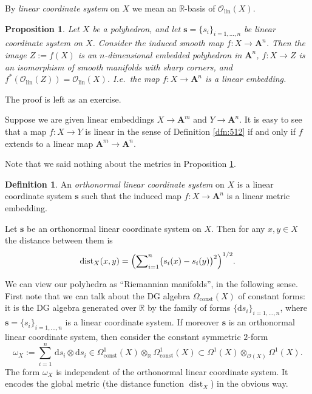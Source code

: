 \documentclass[10pt, a4paper]{amsart}
\newtheorem{prop}[equation]{Proposition}
\theoremstyle{definition}
\newtheorem{dfn}[equation]{Definition}
\numberwithin{equation}{section}
\newcommand{\opn}{\operatorname}
\newcommand{\mcal}[1]{\mathcal{#1}}
\newcommand{\mbf}[1]{\mathbf{#1}}
\newcommand{\mrm}[1]{\mathrm{#1}}
\newcommand{\mbb}[1]{\mathbb{#1}}
\newcommand{\bsym}[1]{\boldsymbol{#1}}
\newcommand{\bosum}{\sum\nolimits}
\newcommand{\R}{\mbb{R}}
\renewcommand{\d}{\mrm{d}}
\begin{document}
By {\em linear coordinate system} on $X$ we mean an $\R$-basis of
$\mcal{O}_{\mrm{lin}}(X)$.

\begin{prop} \label{prop:511}
Let $X$ be a polyhedron, and let $\bsym{s} = \{ s_i \}_{i = 1, \ldots, n}$
be linear coordinate system on $X$. Consider
the induced smooth map  $f : X \to \mbf{A}^{n}$.
Then the image $Z := f(X)$ is an $n$-dimensional embedded polyhedron in
$\mbf{A}^{n}$, $f : X \to Z$ is an isomorphism of 
smooth manifolds with sharp corners, and 
$f^*(\mcal{O}_{\mrm{lin}}(Z)) = \mcal{O}_{\mrm{lin}}(X)$.
I.e.\ the map $f : X \to \mbf{A}^{n}$ is a linear embedding. 
\end{prop}

The proof is left as an exercise. 

Suppose we are given linear embeddings $X \to \mbf{A}^{m}$ and 
$Y \to \mbf{A}^{n}$. It is easy to see that a map $f : X \to Y$ is linear in
the sense of Definition \ref{dfn:512} if and only if $f$ extends to a linear
map $\mbf{A}^{m} \to \mbf{A}^{n}$. 

Note that we said nothing about the metrics in Proposition \ref{prop:511}.

\begin{dfn}
An {\em orthonormal linear coordinate system} on $X$ is a linear coordinate
system $\bsym{s}$ such that the induced map 
$f : X \to \mbf{A}^{n}$ is a linear metric embedding.
\end{dfn}

Let $\bsym{s}$ be an orthonormal linear coordinate system on $X$.
Then for any $x, y \in X$ the distance between them is
\[ \opn{dist}_X(x, y) = \Bigl( \bosum_{i = 1}^n \bigl( s_i(x) - s_i(y) \bigr)^2
\Bigr)^{1/2} . \]

We can view our polyhedra as ``Riemannian manifolds'', in the
following sense. First note that we can talk about the DG algebra 
$\Omega_{\mrm{const}}(X)$ of constant forms: it is the DG algebra generated
over $\R$ by the family of forms $\{ \d s_i \}_{i = 1, \ldots, n}$, where 
$\bsym{s} = \{ s_i \}_{i = 1, \ldots, n}$ is a linear coordinate system.
If moreover $\bsym{s}$ is an orthonormal linear coordinate system, then
consider the constant symmetric $2$-form
\[ \omega_X := \sum_{i = 1}^n \, \d s_i \otimes \d s_i \in 
\Omega^1_{\mrm{const}}(X) \otimes_{\R} \Omega^1_{\mrm{const}}(X) \subset 
\Omega^1(X) \otimes_{\mcal{O}(X)} \Omega^1(X) . \]
The form $\omega_X$ is independent of the orthonormal linear coordinate system.
It encodes the global metric (the distance function $\opn{dist}_X$) in the
obvious way. 
\end{document}
